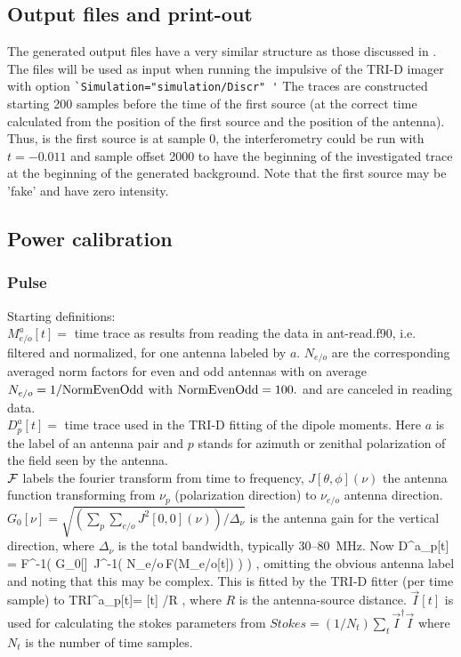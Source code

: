 \subsection{Output files and print-out}%

The generated output files have a very similar structure as those discussed in .
The files will be used as input when running the impulsive of the TRI-D imager with option \verb!`Simulation="simulation/Discr" '!
The traces are constructed starting 200 samples before the time of the first source (at the correct time calculated from the position of the first source and the position of the antenna).
Thus, is the first source is at sample 0, the interferometry could be run with  $t=-0.011$ and sample offset 2000 to have the beginning of the investigated trace at the beginning of the generated background. Note that the first source may be 'fake' and have zero intensity.

\subsection{Power calibration}

\subsubsection{Pulse}
Starting definitions:
\\$M_{e/o}^a[t] = $ time trace as results from reading the data in ant-read.f90, i.e. filtered and normalized, for one antenna labeled by $a$. $N_{e/o}$ are the corresponding averaged norm factors for even and odd antennas with on average $N_{e/o}=1/{\rm NormEvenOdd}$ with ${\rm NormEvenOdd}=100.$ and are canceled in reading data.
\\$D^a_p[t] =$ time trace used in the TRI-D fitting of the dipole moments. Here $a$ is the label of an antenna pair and $p$ stands for azimuth or zenithal polarization of the field seen by the antenna.
\\${\cal F}$ labels the fourier transform from time to frequency, $J[\theta,\phi](\nu)$ the antenna function transforming from $\nu_p$ (polarization direction) to $\nu_{e/o}$ antenna direction.
\\$G_0[\nu] =\sqrt{(\sum_p\sum_{e/o} J^2[0,0](\nu))/\Delta_\nu}$ is the antenna gain for the vertical direction, where $\Delta_\nu$ is the total bandwidth, typically 30--80~MHz.
Now
\beq
D^a_p[t] =  {\cal F}^{-1}\left(  G_0[\nu]\, J^{-1}\left( N_{e/o}\,{\cal F}(M_{e/o}[t]) \right) \right) \;,
\eeq
omitting the obvious antenna label and noting that this may be complex. This is fitted by the TRI-D fitter (per time sample) to
\beq
{\rm TRI}^a_p[t]=   \cdot {}[t] /R \;,
\eeq
where $R$ is the antenna-source distance.  $\vec{I}[t]$ is used for calculating the stokes parameters from $Stokes=(1/N_t)\sum_t \vec{I}^\dagger \vec{I}$ where $N_t$ is the number of time samples.

